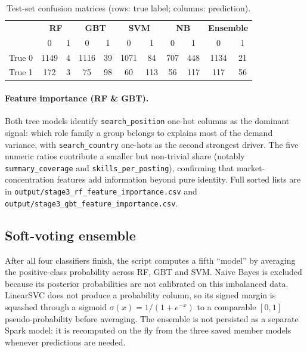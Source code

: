 \documentclass[11pt,a4paper]{article}
\begin{document}
\begin{table}[h]
\centering
\caption{Test-set confusion matrices (rows: true label; columns:
prediction).}
\label{tab:confusion}
\small
\begin{tabular}{lcc|cc|cc|cc|cc}
\toprule
& \multicolumn{2}{c}{\textbf{RF}} & \multicolumn{2}{c}{\textbf{GBT}} & \multicolumn{2}{c}{\textbf{SVM}} & \multicolumn{2}{c}{\textbf{NB}} & \multicolumn{2}{c}{\textbf{Ensemble}} \\
& 0 & 1 & 0 & 1 & 0 & 1 & 0 & 1 & 0 & 1 \\
\midrule
True 0 & 1149 & 4   & 1116 & 39  & 1071 & 84  & 707  & 448 & 1134 & 21  \\
True 1 & 172  & 3   & 75   & 98  & 60   & 113 & 56   & 117 & 117  & 56  \\
\bottomrule
\end{tabular}
\end{table}

\paragraph{Feature importance (RF \& GBT).}  Both tree models
identify \texttt{search\_position} one-hot columns as the dominant
signal: which role family a group belongs to explains most of the
demand variance, with \texttt{search\_country} one-hots as the second
strongest driver.  The five numeric ratios contribute a smaller but
non-trivial share (notably \texttt{summary\_coverage} and
\texttt{skills\_per\_posting}), confirming that market-concentration
features add information beyond pure identity.  Full sorted lists are
in \texttt{output/stage3\_rf\_feature\_importance.csv} and
\texttt{output/stage3\_gbt\_feature\_importance.csv}.

\subsection{Soft-voting ensemble}
After all four classifiers finish, the script computes a fifth
``model'' by averaging the positive-class probability across RF, GBT
and SVM.  Naive Bayes is excluded because its posterior probabilities
are not calibrated on this imbalanced data.  LinearSVC does not
produce a probability column, so its signed margin is squashed
through a sigmoid $\sigma(x) = 1 / (1 + e^{-x})$ to a comparable
$[0,1]$ pseudo-probability before averaging.  The ensemble is not
persisted as a separate Spark model: it is recomputed on the fly from
the three saved member models whenever predictions are needed.
\end{document}
